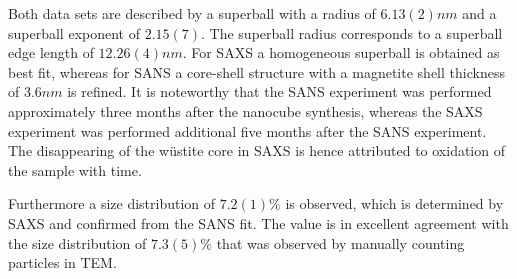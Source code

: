 \documentclass[\main/dresen_thesis.tex]{subfiles}
\begin{document}
  Both data sets are described by a superball with a radius of $6.13(2) \unit{nm}$ and a superball exponent of $2.15(7)$.
  The superball radius corresponds to a superball edge length of $12.26(4) \unit{nm}$.
  For SAXS a homogeneous superball is obtained as best fit, whereas for SANS a core-shell structure with a magnetite shell thickness of $3.6 \unit{nm}$ is refined.
  It is noteworthy that the SANS experiment was performed approximately three months after the nanocube synthesis, whereas the SAXS experiment was performed additional five months after the SANS experiment.
  The disappearing of the w\"ustite core in SAXS is hence attributed to oxidation of the sample with time.

  Furthermore a size distribution of $7.2(1) \%$ is observed, which is determined by SAXS and confirmed from the SANS fit.
  The value is in excellent agreement with the size distribution of $7.3(5) \%$ that was observed by manually counting particles in TEM.
\end{document}
